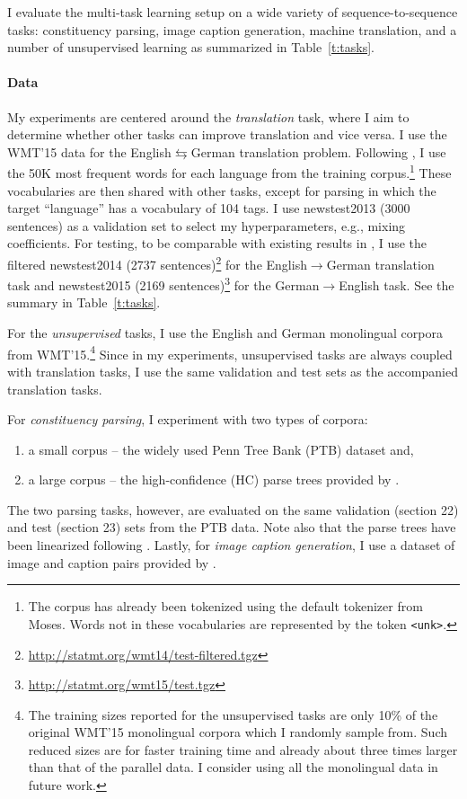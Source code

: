 I evaluate the multi-task learning setup on a wide variety of
sequence-to-sequence tasks: constituency parsing, image caption
generation, machine translation, and a number of unsupervised learning as
summarized in Table~\ref{t:tasks}.

\paragraph{Data}
My experiments are centered around the {\it translation} task, where I aim to determine 
whether other tasks can improve translation and vice versa. I use the WMT'15 data
\citep{bojar15} for the English$\leftrightarrows$German
translation problem. Following 
\citet{luong15attn}, I use the 50K most frequent words for each
language from the training corpus.\footnote{The corpus has already been tokenized using the default
tokenizer from Moses.  Words not in these vocabularies are represented by the token
\texttt{<unk>}.} These vocabularies are then shared with other tasks, except for
parsing in which the target ``language'' has a vocabulary of 104 tags. 
I use newstest2013 (3000 sentences) as a validation set to select my
hyperparameters, e.g., mixing coefficients. For testing, to be comparable with existing results in
\citep{luong15attn}, I use the filtered
newstest2014 (2737
sentences)\footnote{\url{http://statmt.org/wmt14/test-filtered.tgz}} for the
English$\rightarrow$German translation task and newstest2015 (2169
sentences)\footnote{\url{http://statmt.org/wmt15/test.tgz}}
for the German$\rightarrow$English task.
See the summary in Table~\ref{t:tasks}.

For the {\it unsupervised} tasks, I use the English and German monolingual corpora
from WMT'15.\footnote{The training sizes reported for
the unsupervised tasks are
only 10\% of
the original WMT'15 monolingual corpora which I randomly sample from. Such reduced sizes are
for faster training time and already about three times larger than that of the parallel
data. I consider using all the monolingual data in future work.} Since in
my experiments, unsupervised tasks are always coupled with translation tasks,
I use the same validation and test sets as the accompanied translation tasks.

For {\it constituency parsing}, I experiment with two types of corpora:
\begin{enumerate}
\item a small corpus -- the widely used
Penn Tree Bank (PTB) dataset \citep{Marcus:1993:BLA} and,
\item a large corpus -- the high-confidence (HC) parse trees 
provided by \citet{vinyals15grammar}.
\end{enumerate}
The two parsing tasks, however, are evaluated on the same validation (section
22) and test (section 23)
sets from the PTB data. Note also that the parse trees have been linearized
following \citet{vinyals15grammar}. 
Lastly, for {\it image caption generation}, I use a dataset of image and caption pairs provided by
\citet{vinyals15caption}.



